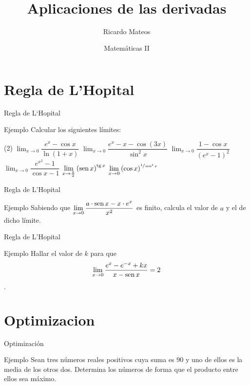 \documentclass[8pt]{beamer}
\title{Aplicaciones de las derivadas}
\author{Ricardo Mateos}
\institute[UHEI-IVED]{Departamento de Matemáticas \\ UHEI - IVED}
\date{Matemáticas II}
\newcommand{\sen}{\mathop{\rm sen}\nolimits}
\newcommand{\tg}{\mathop{\rm tg}\nolimits}
\newcommand{\limite}[2]{\displaystyle \lim_{x \rightarrow #1}{#2}}
\begin{document}
\begin{frame}
\maketitle
\end{frame}

\begin{frame}
\tableofcontents
\end{frame}

\section{Regla de L'Hopital}

\begin{frame}[t]{Regla de L`Hopital}
\begin{exampleblock}{Ejemplo}
Calcular los siguientes límites:
\begin{tasks}[label=\alph*)](2)
\task $\limite{0}{\dfrac{e^x - \cos x}{\ln(1+x)}}$
\task $\limite{0}{\dfrac{e^x-x-\cos(3x)}{\sin^2x}}$
\task $\limite{0}{\dfrac{1-\cos x}{\left( e^x-1 \right)^2}}$
\task $\limite{0}{\dfrac{e^{x^2}-1}{\cos x-1}}$
\task $\limite{\frac{\pi}{2}}{\left( \sen x \right)^{\tg x}}$
\task $\limite{0}{\left( \cos x \right)^{\sfrac{1}{\sen^2 x}}}$
\end{tasks}
\end{exampleblock}
\end{frame}

\begin{frame}[t]{Regla de L'Hopital}
\begin{exampleblock}{Ejemplo}
Sabiendo que $\limite{0}{\dfrac{a\cdot \sen x-x\cdot e^x}{x^2}}$ es finito, calcula el valor de $a$ y el de dicho límite.
\end{exampleblock}
\end{frame}

\begin{frame}[t]{Regla de L'Hopital}
\begin{exampleblock}{Ejemplo}
Hallar el valor de $k$ para que \[\limite{0}{\dfrac{e^x-e^{-x}+kx}{x -\sen x}}=2 \].
\end{exampleblock}
\end{frame}

\section{Optimizacion}

\begin{frame}[t]{Optimización}
\begin{exampleblock}{Ejemplo}
Sean tres números reales positivos cuya suma es 90 y uno de ellos es la media de los
otros dos. Determina los números de forma que el producto entre ellos sea máximo.
\end{exampleblock}
\pause

\end{frame}
\end{document}
